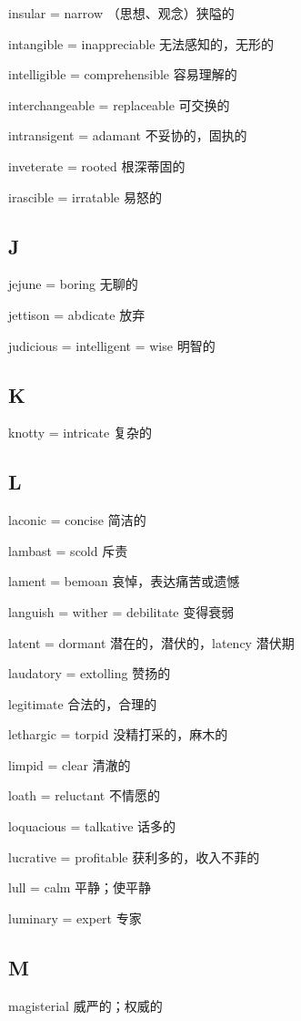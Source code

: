 \documentclass[UTF8, fontset = none, zihao = -4, linespread = 1.1]{ctexart}
\begin{document}
\begin{multicols}{2}
insular = narrow （思想、观念）狭隘的

intangible = inappreciable 无法感知的，无形的

intelligible = comprehensible 容易理解的

interchangeable = replaceable 可交换的

intransigent = adamant 不妥协的，固执的

inveterate = rooted 根深蒂固的

irascible = irratable 易怒的

\subsection*{J}
jejune = boring 无聊的

jettison = abdicate 放弃

judicious = intelligent = wise 明智的

\subsection*{K}
knotty = intricate 复杂的

\subsection*{L}
laconic = concise 简洁的

lambast = scold 斥责

lament = bemoan 哀悼，表达痛苦或遗憾

languish = wither = debilitate 变得衰弱

latent = dormant 潜在的，潜伏的，latency 潜伏期

laudatory = extolling 赞扬的

legitimate 合法的，合理的

lethargic = torpid 没精打采的，麻木的

limpid = clear 清澈的

loath = reluctant 不情愿的

loquacious = talkative 话多的

lucrative = profitable 获利多的，收入不菲的

lull = calm 平静；使平静

luminary = expert 专家

\subsection*{M}
magisterial 威严的；权威的


\end{multicols}
\end{document}
